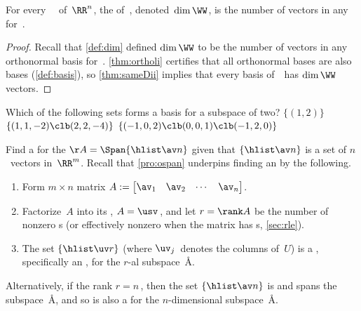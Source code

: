 \begin{theorem} \label{thm:dimii} 
For every ~\WW\ of~\(\RR^n\),  
the  of~\WW, denoted~\(\dim\WW\), is the number of vectors in any  for~\WW. 
\end{theorem}

\begin{proof} 
Recall that \cref{def:dim} defined \(\dim\WW\) to be the number of vectors in any orthonormal basis for~\WW.
\cref{thm:ortholi} certifies that all orthonormal bases are also bases (\cref{def:basis}), so \cref{thm:sameDii} implies that every basis of~\WW\ has \(\dim\WW\) vectors.
\end{proof}




\begin{activity}
Which of the following sets forms a basis for a subspace of  two?
{\(\{(1,2)\}\)}
{\(\{(1,1,-2)\clb (2,2,-4)\}\)}
{\(\{(-1,0,2)\clb (0,0,1)\clb (-1,2,0)\}\)}
\end{activity}





\begin{procedure} \label{pro:bfs}
Find a  for the  \(\AA=\Span\{\hlist\av n\}\) given that $\{\hlist\av n\}$ is a set of $n$~vectors in~\(\RR^m\).
Recall that \cref{pro:ospan} underpins finding an  by the following.
\begin{enumerate}
\item Form \(m\times n\) matrix $A:= \begin{bmatrix} \av_1 & \av_2& \cdots&\av_n \end{bmatrix}$. 
\item Factorize~\(A\) into its \svd, $A=\usv$\,, and let \(r=\rank A\) be the number of nonzero s (or effectively nonzero when the matrix has s, \cref{sec:rle}).
\item The set \(\{\hlist\uv r\}\)  (where \(\uv_j\)~denotes the columns of~$U$) is a , specifically an , for the \(r\)-al subspace~\AA.
\end{enumerate}
Alternatively, if the rank \(r=n\)\,, then the set \(\{\hlist\av n\}\) is  and spans the subspace~\AA, and so is also a  for the \(n\)-dimensional subspace~\AA.
\end{procedure}



